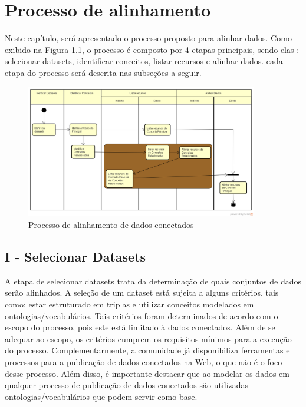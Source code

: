 \chapter{Processo de alinhamento}

Neste capítulo, será apresentado o processo proposto para alinhar dados. Como exibido na Figura \ref{fig:processo}, o processo é composto por 4 etapas principais, sendo elas : selecionar datasets, identificar conceitos, listar recursos e alinhar dados. cada etapa do processo será descrita nas subseções a seguir.


\begin{figure}[!ht]
	\centering
	\includegraphics[width=0.9\textwidth]{./imagens/processo.png}
    \caption{Processo de alinhamento de dados conectados}
	\label{fig:processo}
\end{figure}

\section*{I - Selecionar Datasets}
A etapa de selecionar datasets trata da determinação de quais conjuntos de dados serão alinhados. A seleção de um dataset está sujeita a alguns critérios, tais como: estar estruturado em triplas e utilizar conceitos modelados em ontologias/vocabulários. Tais critérios foram determinados de acordo com o escopo do processo, pois este está limitado à dados conectados. Além de se adequar ao escopo, os critérios cumprem os requisitos mínimos para a execução do processo.
Complementarmente, a comunidade já disponibiliza ferramentas e processos para a publicação de dados conectados na Web, o que não é o foco desse processo. Além disso, é importante destacar que ao modelar os dados em qualquer processo de publicação de dados conectados são utilizadas ontologias/vocabulários que podem servir como base.

